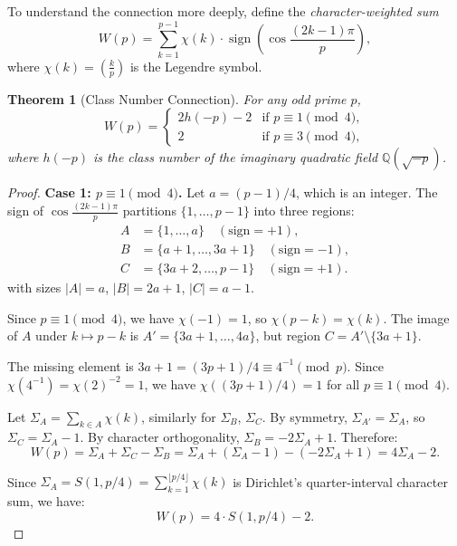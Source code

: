 \documentclass[11pt,a4paper]{article}
\newtheorem{theorem}{Theorem}
\begin{document}
To understand the connection more deeply, define the \emph{character-weighted sum}
\[
W(p) = \sum_{k=1}^{p-1} \chi(k) \cdot \operatorname{sign}\left(\cos\frac{(2k-1)\pi}{p}\right),
\]
where $\chi(k) = \left(\frac{k}{p}\right)$ is the Legendre symbol.

\begin{theorem}[Class Number Connection]\label{thm:class}
For any odd prime $p$,
\[
W(p) = \begin{cases}
2h(-p) - 2 & \text{if } p \equiv 1 \pmod{4}, \\
2 & \text{if } p \equiv 3 \pmod{4},
\end{cases}
\]
where $h(-p)$ is the class number of the imaginary quadratic field $\mathbb{Q}(\sqrt{-p})$.
\end{theorem}

\begin{proof}
\textbf{Case 1: $p \equiv 1 \pmod 4$.} Let $a = (p-1)/4$, which is an integer. The sign of $\cos\frac{(2k-1)\pi}{p}$ partitions $\{1, \ldots, p-1\}$ into three regions:
\begin{align*}
A &= \{1, \ldots, a\} \quad (\text{sign} = +1), \\
B &= \{a+1, \ldots, 3a+1\} \quad (\text{sign} = -1), \\
C &= \{3a+2, \ldots, p-1\} \quad (\text{sign} = +1).
\end{align*}
with sizes $|A| = a$, $|B| = 2a+1$, $|C| = a-1$.

Since $p \equiv 1 \pmod 4$, we have $\chi(-1) = 1$, so $\chi(p-k) = \chi(k)$. The image of $A$ under $k \mapsto p-k$ is $A' = \{3a+1, \ldots, 4a\}$, but region $C = A' \setminus \{3a+1\}$.

The missing element is $3a+1 = (3p+1)/4 \equiv 4^{-1} \pmod p$. Since $\chi(4^{-1}) = \chi(2)^{-2} = 1$, we have $\chi((3p+1)/4) = 1$ for all $p \equiv 1 \pmod 4$.

Let $\Sigma_A = \sum_{k \in A} \chi(k)$, similarly for $\Sigma_B$, $\Sigma_C$. By symmetry, $\Sigma_{A'} = \Sigma_A$, so $\Sigma_C = \Sigma_A - 1$. By character orthogonality, $\Sigma_B = -2\Sigma_A + 1$. Therefore:
\[
W(p) = \Sigma_A + \Sigma_C - \Sigma_B = \Sigma_A + (\Sigma_A - 1) - (-2\Sigma_A + 1) = 4\Sigma_A - 2.
\]

Since $\Sigma_A = S(1, p/4) = \sum_{k=1}^{\lfloor p/4 \rfloor} \chi(k)$ is Dirichlet's quarter-interval character sum, we have:
\begin{equation}\label{eq:reduction}
W(p) = 4 \cdot S(1, p/4) - 2.
\end{equation}


\end{proof}
\end{document}
